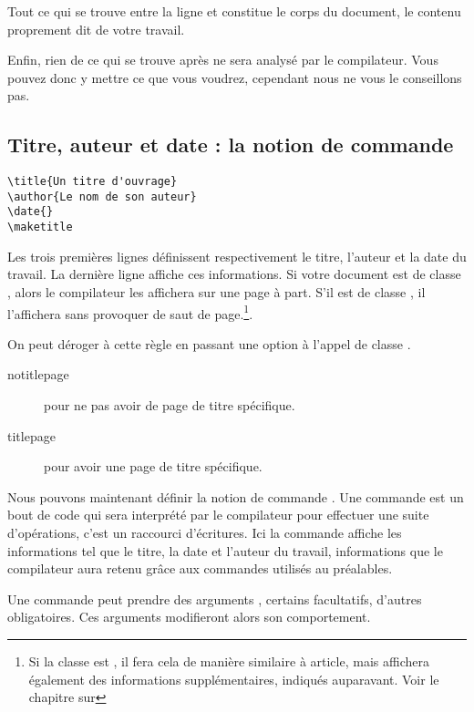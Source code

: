 Tout ce qui se trouve entre la ligne \verb|| et \verb|| constitue le corps du document, le contenu proprement dit de votre travail.

Enfin, rien de ce qui se trouve après \verb|| ne sera analysé par le compilateur. Vous pouvez donc y mettre ce que vous voudrez, cependant nous ne vous le conseillons pas.

\subsection{Titre, auteur et date : la notion de commande}\label{notioncommande}

\begin{verbatim}
\title{Un titre d'ouvrage}
\author{Le nom de son auteur}
\date{}
\maketitle
\end{verbatim}

Les trois premières lignes définissent respectivement le titre, l'auteur et la date du travail.  
La dernière ligne affiche ces informations. Si votre document est de classe  , alors le compilateur les affichera sur une page à part. S'il est de classe  , il l'affichera sans provoquer de saut de page.\footnote{Si la classe  est , il fera cela de manière similaire à article, mais affichera également des informations supplémentaires, indiqués auparavant. Voir le chapitre sur }.

On peut déroger à cette règle en passant une option à l'appel de classe .
\begin{description}
\item[notitlepage] pour ne pas avoir de page de titre spécifique.
\item[titlepage] pour avoir une page de titre spécifique.
\end{description}

Nous pouvons maintenant définir la notion de commande . Une commande  est un bout de code qui sera interprété par le compilateur pour effectuer une suite d'opérations, c'est un raccourci d'écritures. 
Ici la commande  affiche les informations tel que le titre, la date et l'auteur du travail, informations que le compilateur aura retenu grâce aux commandes utilisés au préalables.

Une commande peut prendre des arguments , certains facultatifs, d'autres obligatoires. Ces arguments  modifieront alors son comportement.

